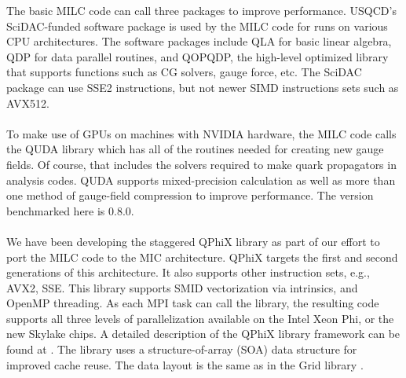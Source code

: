 \documentclass[epj]{webofc}
\begin{document}
The basic MILC code can call three packages to improve performance.
USQCD's SciDAC-funded software package is used by the MILC code for 
runs on various CPU architectures.  The software packages include
QLA for basic linear algebra, QDP for data parallel routines,
and QOPQDP, the high-level optimized library that supports functions
such as CG solvers, gauge force, etc.
The SciDAC package can use SSE2 instructions, but not newer SIMD
instructions sets such as AVX512.\\
\\
To make use of GPUs on machines with NVIDIA hardware, the MILC code calls
the QUDA library which has all of the routines needed for creating new
gauge fields.  Of course, that includes the solvers required to make quark
propagators in analysis codes.  QUDA supports mixed-precision calculation
as well as more than one method of gauge-field compression to improve
performance.
The version benchmarked here is 0.8.0. \\
\\
We have been developing the staggered QPhiX library 
as part of our effort to port the MILC code to the MIC architecture. 
QPhiX targets the first and second generations of this architecture. %
It also supports other instruction sets, e.g., AVX2, SSE. 
This library %
supports SMID vectorization via intrinsics, and OpenMP threading.  As
each MPI task can call the library, the resulting code supports all
three levels of parallelization available on the Intel Xeon Phi, or the
new Skylake chips.
A detailed description of the QPhiX library framework can be found at \cite{QPhiX}. 
The library uses a structure-of-array (SOA) data structure for improved cache reuse. 
The data layout is the same as in the Grid library \cite{Grid}. 
\end{document}
